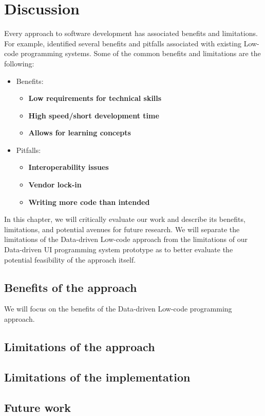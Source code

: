 \chapter{Discussion}
\label{chap:discussion}

Every approach to software development has associated benefits and limitations.
For example, \citet{Pinho_Aguiar_Amaral_2023} identified several benefits and pitfalls associated with existing Low-code programming systems.
Some of the common benefits and limitations are the following:
\begin{itemize}
	\item Benefits:
	      \begin{itemize}
		      \item \textbf{Low requirements for technical skills}
		      \item \textbf{High speed/short development time}
		      \item \textbf{Allows for learning concepts}
	      \end{itemize}

	\item Pitfalls:
	      \begin{itemize}
		      \item \textbf{Interoperability issues}
		      \item \textbf{Vendor lock-in}
		      \item \textbf{Writing more code than intended}
	      \end{itemize}

\end{itemize}


In this chapter, we will critically evaluate our work and describe its benefits, limitations, and potential avenues for future research.
We will separate the limitations of the Data-driven Low-code approach from the limitations of our Data-driven UI programming system prototype as to
better evaluate the potential feasibility of the approach itself.

\section{Benefits of the approach}

We will focus on the benefits of the Data-driven Low-code programming approach.

\section{Limitations of the approach}

\section{Limitations of the implementation}

\section{Future work}

